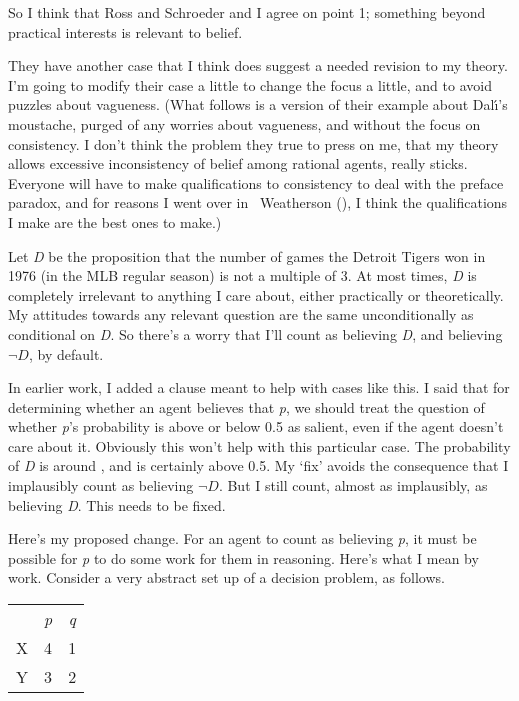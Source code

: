 \documentclass[
  10pt,
  letterpaper,
  DIV=11,
  numbers=noendperiod,
  twoside]{scrartcl}
\begin{document}
So I think that Ross and Schroeder and I agree on point 1; something
beyond practical interests is relevant to belief.

They have another case that I think does suggest a needed revision to my
theory. I'm going to modify their case a little to change the focus a
little, and to avoid puzzles about vagueness. (What follows is a version
of their example about Dalı́'s moustache, purged of any worries about
vagueness, and without the focus on consistency. I don't think the
problem they true to press on me, that my theory allows excessive
inconsistency of belief among rational agents, really sticks. Everyone
will have to make qualifications to consistency to deal with the preface
paradox, and for reasons I went over in ~Weatherson
(), I think the qualifications
I make are the best ones to make.)

Let \emph{D} be the proposition that the number of games the Detroit
Tigers won in 1976 (in the MLB regular season) is not a multiple of 3.
At most times, \emph{D} is completely irrelevant to anything I care
about, either practically or theoretically. My attitudes towards any
relevant question are the same unconditionally as conditional on
\emph{D}. So there's a worry that I'll count as believing \emph{D}, and
believing \(\neg D\), by default.

In earlier work, I added a clause meant to help with cases like this. I
said that for determining whether an agent believes that \emph{p}, we
should treat the question of whether \emph{p}'s probability is above or
below 0.5 as salient, even if the agent doesn't care about it. Obviously
this won't help with this particular case. The probability of \emph{D}
is around , and is certainly above 0.5. My `fix' avoids the consequence
that I implausibly count as believing \(\neg D\). But I still count,
almost as implausibly, as believing \emph{D}. This needs to be fixed.

Here's my proposed change. For an agent to count as believing \emph{p},
it must be possible for \emph{p} to do some work for them in reasoning.
Here's what I mean by work. Consider a very abstract set up of a
decision problem, as follows.

\begin{longtable}[]{@{}lcc@{}}
\toprule\noalign{}
\endhead
\bottomrule\noalign{}
\endlastfoot
& \emph{p} & \emph{q} \\
X & 4 & 1 \\
Y & 3 & 2 \\
\end{longtable}
\end{document}
